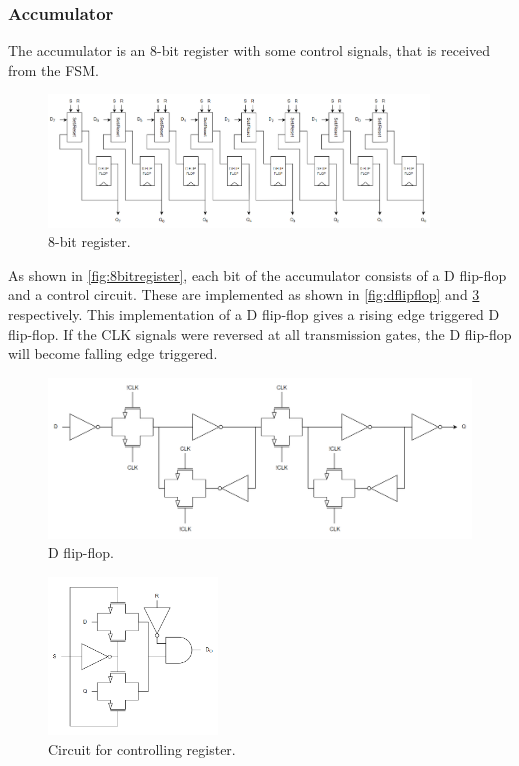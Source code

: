 \subsubsection{Accumulator}
\label{subsubsec:accumulator}
The accumulator is an 8-bit register with some control signals, that is received from the FSM. 

\begin{figure}[H]
    \centering
    \includegraphics[width=0.9\textwidth]{Figures/8bitRegister.png}
    \caption{8-bit register.}
    \label{fig:8bitregister}
\end{figure}

As shown in \autoref{fig:8bitregister}, each bit of the accumulator consists of a D flip-flop and a control circuit. These are implemented as shown in \autoref{fig:dflipflop} \cite[p.18]{digital_design} and \ref{fig:setreset} respectively. This implementation of a D flip-flop gives a rising edge triggered D flip-flop. If the CLK signals were reversed at all transmission gates, the D flip-flop will become falling edge triggered.  

\begin{figure}[H]
    \centering
    \includegraphics[width=\textwidth]{Figures/D_Flip_Flop.png}
    \caption{D flip-flop.}
    \label{fig:dflipflop}
\end{figure}

\begin{figure}[H]
    \centering
    \includegraphics[width=0.4\textwidth]{Figures/setReset.png}
    \caption{Circuit for controlling register.}
    \label{fig:setreset}
\end{figure}


